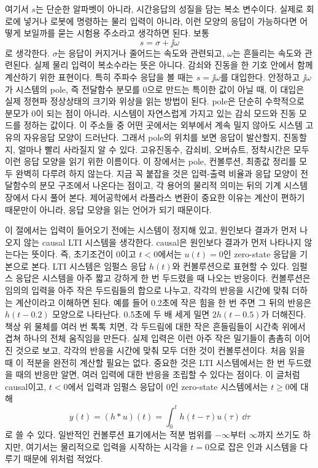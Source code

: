여기서 $s$는 단순한 알파벳이 아니라, 시간응답의 성질을 담는 복소 변수이다.
실제로 회로에 넣거나 로봇에 명령하는 물리 입력이 아니라, 이런 모양의 응답이 가능하다면 어떻게 보일까를 묻는 시험용 주소라고 생각하면 된다.
보통
\begin{equation}
  s=\sigma+\jj\omega
\end{equation}
로 생각한다.
$\sigma$는 응답이 커지거나 줄어드는 속도와 관련되고, $\omega$는 흔들리는 속도와 관련된다.
실제 물리 입력이 복소수라는 뜻은 아니다.
감쇠와 진동을 한 기호 안에서 함께 계산하기 위한 표현이다.
특히 주파수 응답을 볼 때는 $s=\jj\omega$를 대입한다.
안정하고 $\jj\omega$가 시스템의 pole, 즉 전달함수 분모를 0으로 만드는 특이한 값이 아닐 때, 이 대입은 실제 정현파 정상상태의 크기와 위상을 읽는 방법이 된다.
pole은 단순히 수학적으로 분모가 0이 되는 점이 아니라, 시스템이 자연스럽게 가지고 있는 감쇠 모드와 진동 모드를 정하는 값이다.
이 주소들 중 어떤 곳에서는 외부에서 계속 밀지 않아도 시스템 고유의 자유응답 모양이 드러난다.
그래서 pole의 위치를 보면 응답이 발산할지, 진동할지, 얼마나 빨리 사라질지 알 수 있다.
고유진동수, 감쇠비, 오버슈트, 정착시간은 모두 이런 응답 모양을 읽기 위한 이름이다.
이 장에서는 pole, 컨볼루션, 최종값 정리를 모두 완벽히 다루려 하지 않는다.
지금 꼭 붙잡을 것은 입력-출력 비율과 응답 모양이 전달함수의 분모 구조에서 나온다는 점이고, 각 용어의 물리적 의미는 뒤의 기계 시스템 장에서 다시 풀어 본다.
제어공학에서 라플라스 변환이 중요한 이유는 계산이 편하기 때문만이 아니라, 응답 모양을 읽는 언어가 되기 때문이다.

이 절에서는 입력이 들어오기 전에는 시스템이 정지해 있고, 원인보다 결과가 먼저 나오지 않는 causal LTI 시스템을 생각한다.
causal은 원인보다 결과가 먼저 나타나지 않는다는 뜻이다.
즉, 초기조건이 0이고 $t<0$에서는 $u(t)=0$인 zero-state 응답을 기본으로 본다.
LTI 시스템은 임펄스 응답 $h(t)$와 컨볼루션으로 표현할 수 있다.
임펄스 응답은 시스템을 아주 짧고 강하게 한 번 두드렸을 때 나오는 반응이다.
컨볼루션은 임의의 입력을 아주 작은 두드림들의 합으로 나누고, 각각의 반응을 시간에 맞춰 더하는 계산이라고 이해하면 된다.
예를 들어 0.2초에 작은 힘을 한 번 주면 그 뒤의 반응은 $h(t-0.2)$ 모양으로 나타난다.
0.5초에 두 배 세게 밀면 $2h(t-0.5)$가 더해진다.
책상 위 물체를 여러 번 톡톡 치면, 각 두드림에 대한 작은 흔들림들이 시간축 위에서 겹쳐 하나의 전체 움직임을 만든다.
실제 입력은 이런 아주 작은 밀기들이 촘촘히 이어진 것으로 보고, 각각의 반응을 시간에 맞춰 모두 더한 것이 컨볼루션이다.
처음 읽을 때 이 적분을 완전히 계산할 필요는 없다.
중요한 것은 LTI 시스템에서는 한 번 두드렸을 때의 반응만 알면, 여러 입력에 대한 반응을 조립할 수 있다는 점이다.
이 글처럼 causal이고, $t<0$에서 입력과 임펄스 응답이 0인 zero-state 시스템에서는 $t\ge0$에 대해
\begin{equation}
  y(t) = (h * u)(t) = \int_{0}^{t} h(t-\tau) u(\tau) \, \dd \tau
\end{equation}
로 쓸 수 있다.
일반적인 컨볼루션 표기에서는 적분 범위를 $-\infty$부터 $\infty$까지 쓰기도 하지만, 여기서는 물리적으로 입력을 시작하는 시각을 $t=0$으로 잡은 인과 시스템을 다루기 때문에 위처럼 적었다.

